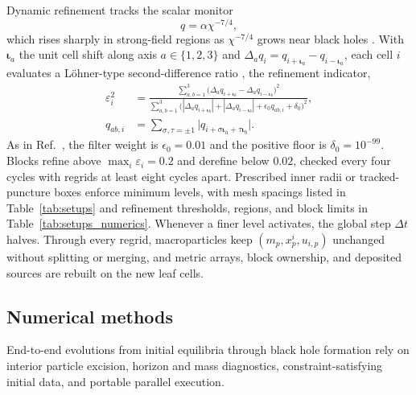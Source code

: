 Dynamic refinement tracks the scalar monitor
\begin{equation}\label{eq:refinement_monitor}
q = \alpha \chi^{-7/4},
\end{equation}
which rises sharply in strong-field regions as $\chi^{-7/4}$ grows near black holes \cite{Wu:2026nrpic}. With $\bm{\iota}_a$ the unit cell shift along axis $a \in \{1,2,3\}$ and $\Delta_a q_i = q_{i+\bm{\iota}_a} - q_{i-\bm{\iota}_a}$, each cell $i$ evaluates a L\"ohner-type second-difference ratio \cite{1987CMAME..61..323L,Wu:2026nrpic}, the refinement indicator,
\begin{align}\label{eq:refinement_indicator}
\varepsilon_i^2 &= \frac{\sum_{a,b=1}^{3} \bigl(\Delta_a q_{i+\bm{\iota}_b} - \Delta_a q_{i-\bm{\iota}_b}\bigr)^2}{\sum_{a,b=1}^{3} \bigl(|\Delta_a q_{i+\bm{\iota}_b}| + |\Delta_a q_{i-\bm{\iota}_b}| + \epsilon_0 q_{ab,i} + \delta_0\bigr)^2}, \nonumber\\
q_{ab,i} &= \sum_{\sigma,\tau=\pm 1} \bigl|q_{i+\sigma\bm{\iota}_a+\tau\bm{\iota}_b}\bigr|.
\end{align}
As in Ref.~\cite{Wu:2026nrpic}, the filter weight is $\epsilon_0 = 0.01$ and the positive floor is $\delta_0 = 10^{-99}$. Blocks refine above $\max_i \varepsilon_i = 0.2$ and derefine below $0.02$, checked every four cycles with regrids at least eight cycles apart. Prescribed inner radii or tracked-puncture boxes enforce minimum levels, with mesh spacings listed in Table~\ref{tab:setups} and refinement thresholds, regions, and block limits in Table~\ref{tab:setups_numerics}. Whenever a finer level activates, the global step $\Delta t$ halves. Through every regrid, macroparticles keep $(m_p, x_p^i, u_{i,p})$ unchanged without splitting or merging, and metric arrays, block ownership, and deposited sources are rebuilt on the new leaf cells.

\subsection{Numerical methods}\label{sec:numerical_methods}

End-to-end evolutions from initial equilibria through black hole formation rely on interior particle excision, horizon and mass diagnostics, constraint-satisfying initial data, and portable parallel execution.

